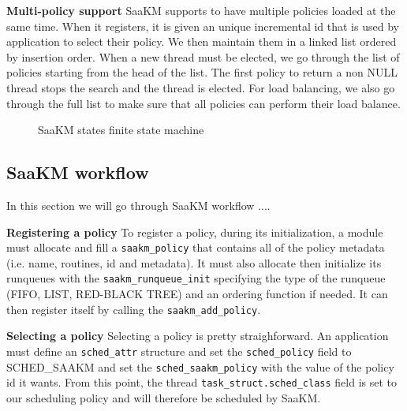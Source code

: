 \textbf{Multi-policy support} SaaKM supports to have multiple policies loaded at the same time. When it registers, it is given an unique incremental id that is used by application to select their policy. We then maintain them in a linked list ordered by insertion order. When a new thread must be elected, we go through the list of policies starting from the head of the list. The first policy to return a non NULL thread stops the search and the thread is elected. For load balancing, we also go through the full list to make sure that all policies can perform their load balance.

\begin{figure}[htbp]
        \centering
        
        \caption{SaaKM states finite state machine}
        \label{fig:saakm-states}
\end{figure}


\subsection{SaaKM workflow}

In this section we will go through SaaKM workflow ....

\textbf{Registering a policy} To register a policy, during its initialization, a module must allocate and fill a \texttt{saakm\_policy} that contains all of the policy metadata (i.e. name, routines, id and metadata). It must also allocate then initialize its runqueues with the \texttt{saakm\_runqueue\_init} specifying the type of the runqueue (FIFO, LIST, RED-BLACK TREE) and an ordering function if needed. It can then register itself by calling the \texttt{saakm\_add\_policy}. 

\textbf{Selecting a policy} Selecting a policy is pretty straighforward. An application must define an \texttt{sched\_attr} structure and set the \texttt{sched\_policy} field to SCHED\_SAAKM and set the \texttt{sched\_saakm\_policy} with the value of the policy id it wants. From this point, the thread \texttt{task\_struct.sched\_class} field is set to our scheduling policy and will therefore be scheduled by SaaKM. 

